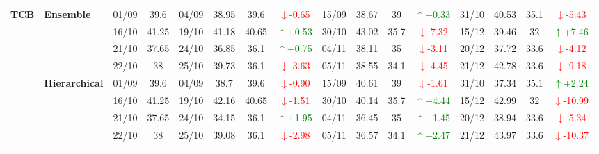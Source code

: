 {\begin{longtable}{llcc|cccc|cccc|cccc}
\multirow{12}{*}{\textbf{TCB}} 
& \textbf{Ensemble}
& 01/09 & 39.6 & 04/09 & 38.95 & 39.6 & \textcolor{red}{\(\downarrow\)-0.65} & 15/09 & 38.67 & 39 & \textcolor{green}{\(\uparrow\)+0.33} & 31/10 & 40.53 & 35.1 & \textcolor{red}{\(\downarrow\)-5.43} \\

&
& 16/10 & 41.25 & 19/10 & 41.18 & 40.65 & \textcolor{green}{\(\uparrow\)+0.53} & 30/10 & 43.02 & 35.7 & \textcolor{red}{\(\downarrow\)-7.32} & 15/12 & 39.46 & 32 & \textcolor{green}{\(\uparrow\)+7.46} \\

&
& 21/10 & 37.65 & 24/10 & 36.85 & 36.1 & \textcolor{green}{\(\uparrow\)+0.75} & 04/11 & 38.11 & 35 & \textcolor{red}{\(\downarrow\)-3.11} & 20/12 & 37.72 & 33.6 & \textcolor{red}{\(\downarrow\)-4.12} \\

&
& 22/10 & 38 & 25/10 & 39.73 & 36.1 & \textcolor{red}{\(\downarrow\)-3.63} & 05/11 & 38.55 & 34.1 & \textcolor{red}{\(\downarrow\)-4.45} & 21/12 & 42.78 & 33.6 & \textcolor{red}{\(\downarrow\)-9.18} \\
\cmidrule(lr){2-16}


& \textbf{Hierarchical}
& 01/09 & 39.6 & 04/09 & 38.7 & 39.6 & \textcolor{red}{\(\downarrow\)-0.90} & 15/09 & 40.61 & 39 & \textcolor{red}{\(\downarrow\)-1.61} & 31/10 & 37.34 & 35.1 & \textcolor{green}{\(\uparrow\)+2.24} \\

&
& 16/10 & 41.25 & 19/10 & 42.16 & 40.65 & \textcolor{red}{\(\downarrow\)-1.51} & 30/10 & 40.14 & 35.7 & \textcolor{green}{\(\uparrow\)+4.44} & 15/12 & 42.99 & 32 & \textcolor{red}{\(\downarrow\)-10.99} \\

&
& 21/10 & 37.65 & 24/10 & 34.15 & 36.1 & \textcolor{green}{\(\uparrow\)+1.95} & 04/11 & 36.45 & 35 & \textcolor{green}{\(\uparrow\)+1.45} & 20/12 & 38.94 & 33.6 & \textcolor{red}{\(\downarrow\)-5.34} \\

&
& 22/10 & 38 & 25/10 & 39.08 & 36.1 & \textcolor{red}{\(\downarrow\)-2.98} & 05/11 & 36.57 & 34.1 & \textcolor{green}{\(\uparrow\)+2.47} & 21/12 & 43.97 & 33.6 & \textcolor{red}{\(\downarrow\)-10.37} \\
\cmidrule(lr){2-16}




\end{longtable}}

